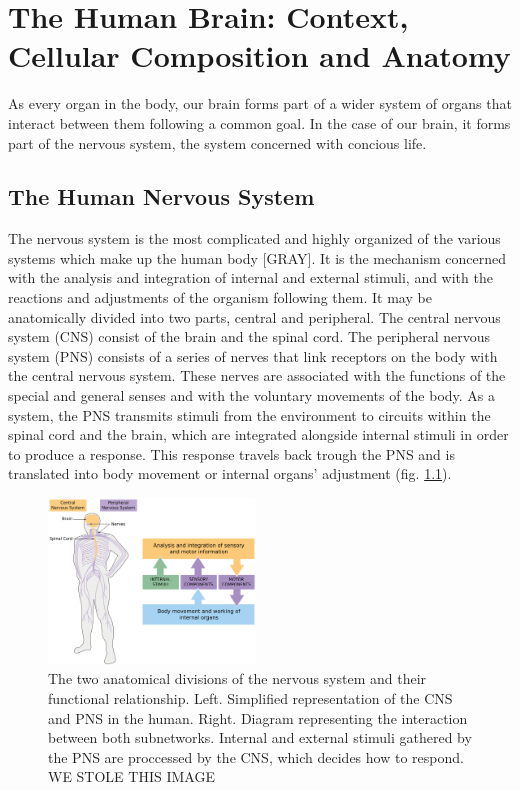 
\chapter{The Human Brain: Context, Cellular Composition and Anatomy}

As every organ in the body, our brain forms part of a wider system of organs that interact between them following a common goal.
In the case of our brain, it forms part of the nervous system, the system concerned with concious life.

\section{The Human Nervous System}
The nervous system is the most complicated and highly organized of the various systems which make up the human body [GRAY].
It is the mechanism concerned with the analysis and integration of internal and external stimuli, and with the reactions and adjustments of the organism following them.
It may be anatomically divided into two parts, central and peripheral.
The central nervous system (CNS) consist of the brain and the spinal cord.
The peripheral nervous system (PNS) consists of a series of nerves that link receptors on the body with the central nervous system.
These nerves are associated with the functions of the special and general senses and with the voluntary movements of the body.
As a system, the PNS transmits stimuli from the environment to circuits within the spinal cord and the brain, which are integrated alongside internal stimuli in order to produce a response.
This response travels back trough the PNS and is translated into body movement or internal organs' adjustment (fig. \ref{fig:cns_and_pns}).

\begin{figure}[h!]                                                                                                                    
    \includegraphics[width=0.49\textwidth]{2.neuroanatomy/img/pns_and_cns.png}
    \caption{The two anatomical divisions of the nervous system and their functional relationship.
             Left. Simplified representation of the CNS and PNS in the human.
             Right. Diagram representing the interaction between both subnetworks. Internal and external stimuli gathered by the PNS are proccessed by the CNS, which decides how to respond.
             WE STOLE THIS IMAGE}
    \label{fig:cns_and_pns}
\end{figure}  


